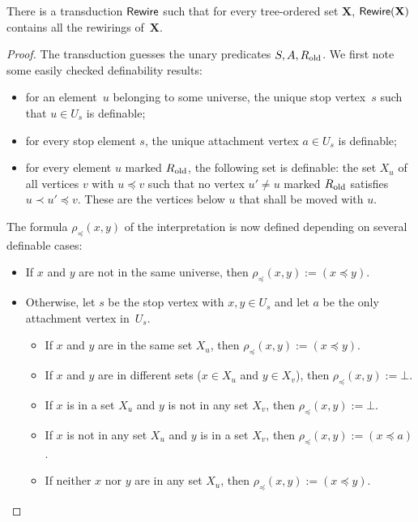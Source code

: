\documentclass[1p,number,11pt]{elsarticle}
\theoremstyle{plain}
\newcommand{\is}{\mathrel{:=}}
\DeclareMathOperator{\rew}{{\sf Rewire}}
\begin{document}
\begin{lemma}\label{lem:rewire}
    There is a transduction $\rew$ such that 
    for every tree-ordered set $\mathbf X$, $\rew(\mathbf X)$ contains all the rewirings of~$\mathbf X$.
\end{lemma}
\begin{proof}
The transduction guesses the unary predicates $S,A,R_{\rm old}$. 
We first note some easily checked
definability results:
\begin{itemize}
    \item for an element~$u$ belonging to some universe, the unique stop
    vertex~$s$ such that $u\in U_s$ is definable;
    \item for every stop element $s$, the unique attachment vertex $a\in U_s$ is definable;
    \item for every element $u$ marked $R_{\rm old}$, the following set is definable: the set $X_u$ of all vertices $v$ with $u\preceq v$ such that no vertex $u'\neq u$ marked $R_{\rm old}$ satisfies $u\prec u'\preceq v$. These are the vertices below $u$ that shall be moved with $u$.
\end{itemize}
\medskip
The formula $\rho_\preceq(x,y)$ of the interpretation is now defined depending on several definable cases:
\begin{itemize}
    \item If $x$ and $y$ are not in the same universe, then $\rho_\preceq(x,y)\is (x\preceq y)$.
    \item Otherwise, let $s$ be the stop vertex with $x,y\in U_s$ and let $a$ be the only attachment vertex in~$U_s$. 
    \begin{itemize}
    \item If $x$ and $y$ are in the same set $X_u$, then $\rho_\preceq(x,y)\is (x\preceq y)$.
    \item If $x$ and $y$ are in different sets ($x \in X_u$ and $y \in X_v$), then $\rho_\preceq(x,y)\is \bot$.
    \item If $x$ is in a set $X_u$ and $y$ is not in any set $X_v$, then $\rho_\preceq(x,y)\is \bot$.
    \item If $x$ is not in any set $X_u$ and $y$ is in a set $X_v$, then $\rho_\preceq(x,y)\is (x  \preceq a)$.
    \item If neither $x$ nor $y$ are in any set $X_u$, then $\rho_\preceq(x,y)\is (x\preceq y)$.\qedhere
    \end{itemize}
\end{itemize}
\end{proof}
\end{document}
